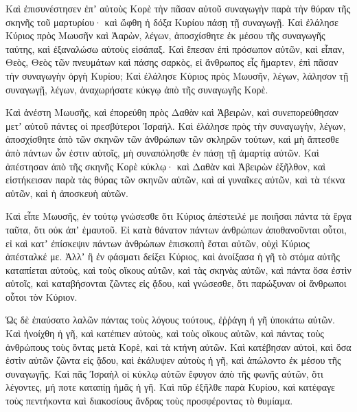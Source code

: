 {Καὶ ἐπισυνέστησεν ἐπʼ αὐτοὺς Κορὲ τὴν πᾶσαν αὐτοῦ συναγωγὴν παρὰ τὴν θύραν τῆς σκηνῆς τοῦ μαρτυρίου· καὶ ὤφθη ἡ δόξα Κυρίου πάσῃ τῇ συναγωγῇ.
Καὶ ἐλάλησε Κύριος πρὸς Μωυσῆν καὶ Ἀαρὼν, λέγων,
ἀποσχίσθητε ἐκ μέσου τῆς συναγωγῆς ταύτης, καὶ ἐξαναλώσω αὐτοὺς εἰσάπαξ.
Καὶ ἔπεσαν ἐπὶ πρόσωπον αὐτῶν, καὶ εἶπαν, Θεὸς, Θεὸς τῶν πνευμάτων καὶ πάσης σαρκὸς, εἰ ἄνθρωπος εἷς ἥμαρτεν, ἐπὶ πᾶσαν τὴν συναγωγὴν ὀργὴ Κυρίου;
Καὶ ἐλάλησε Κύριος πρὸς Μωυσῆν, λέγων,
λάλησον τῇ συναγωγῇ, λέγων, ἀναχωρήσατε κύκγῳ ἀπὸ τῆς συναγωγῆς Κορὲ.
\par }{\PP {}Καὶ ἀνέστη Μωυσῆς, καὶ ἐπορεύθη πρὸς Δαθὰν καὶ Ἀβειρὼν, καὶ συνεπορεύθησαν μετʼ αὐτοῦ πάντες οἱ πρεσβύτεροι Ἰσραήλ.
Καὶ ἐλάλησε πρὸς τὴν συναγωγὴν, λέγων, ἀποσχίσθητε ἀπὸ τῶν σκηνῶν τῶν ἀνθρώπων τῶν σκληρῶν τούτων, καὶ μὴ ἅπτεσθε ἀπὸ πάντων ὧν ἐστιν αὐτοῖς, μὴ συναπόλησθε ἐν πάσῃ τῇ ἁμαρτίᾳ αὐτῶν.
Καὶ ἀπέστησαν ἀπὸ τῆς σκηνῆς Κορὲ κύκλῳ· καὶ Δαθὰν καὶ Ἀβειρὼν ἐξῆλθον, καὶ εἱστήκεισαν παρὰ τὰς θύρας τῶν σκηνῶν αὐτῶν, καὶ αἱ γυναῖκες αὐτῶν, καὶ τὰ τέκνα αὐτῶν, καὶ ἡ ἀποσκευὴ αὐτῶν.
\par }{\PP {}Καὶ εἶπε Μωυσῆς, ἐν τούτῳ γνώσεσθε ὅτι Κύριος ἀπέστειλέ με ποιῆσαι πάντα τὰ ἔργα ταῦτα, ὅτι οὐκ ἀπʼ ἐμαυτοῦ.
Εἰ κατὰ θάνατον πάντων ἀνθρώπων ἀποθανοῦνται οὗτοι, εἰ καὶ κατʼ ἐπίσκεψιν πάντων ἀνθρώπων ἐπισκοπὴ ἔσται αὐτῶν, οὐχὶ Κύριος ἀπέσταλκέ με.
Ἀλλʼ ἢ ἐν φάσματι δείξει Κύριος, καὶ ἀνοίξασα ἡ γῆ τὸ στόμα αὐτῆς καταπίεται αὐτοὺς, καὶ τοὺς οἴκους αὐτῶν, καὶ τὰς σκηνὰς αὐτῶν, καὶ πάντα ὅσα ἐστὶν αὐτοῖς, καὶ καταβήσονται ζῶντες εἰς ᾅδου, καὶ γνώσεσθε, ὅτι παρώξυναν οἱ ἄνθρωποι οὗτοι τὸν Κύριον.
\par }{\PP {}Ὡς δὲ ἐπαύσατο λαλῶν πάντας τοὺς λόγους τούτους, ἐῤῥάγη ἡ γῆ ὑποκάτω αὐτῶν.
Καὶ ἠνοίχθη ἡ γῆ, καὶ κατέπιεν αὐτοὺς, καὶ τοὺς οἴκους αὐτῶν, καὶ πάντας τοὺς ἀνθρώπους τοὺς ὄντας μετὰ Κορὲ, καὶ τὰ κτήνη αὐτῶν.
Καὶ κατέβησαν αὐτοὶ, καὶ ὅσα ἐστὶν αὐτῶν ζῶντα εἰς ᾅδου, καὶ ἐκάλυψεν αὐτοὺς ἡ γῆ, καὶ ἀπώλοντο ἐκ μέσου τῆς συναγωγῆς.
Καὶ πᾶς Ἰσραὴλ οἱ κύκλῳ αὐτῶν ἔφυγον ἀπὸ τῆς φωνῆς αὐτῶν, ὅτι λέγοντες, μή ποτε καταπίῃ ἡμᾶς ἡ γῆ.
Καὶ πῦρ ἐξῆλθε παρὰ Κυρίου, καὶ κατέφαγε τοὺς πεντήκοντα καὶ διακοσίους ἄνδρας τοὺς προσφέροντας τὸ θυμίαμα.

}
